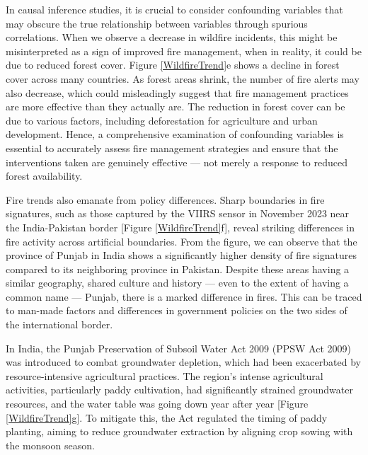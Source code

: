 \documentclass[
  12 pt,
]{Nemilov}
\begin{document}
In causal inference studies, it is crucial to consider confounding variables that may obscure the true relationship between variables through spurious correlations. When we observe a decrease in wildfire incidents, this might be misinterpreted as a sign of improved fire management, when in reality, it could be due to reduced forest cover. Figure \ref{WildfireTrend}e shows a decline in forest cover across many countries. As forest areas shrink, the number of fire alerts may also decrease, which could misleadingly suggest that fire management practices are more effective than they actually are. The reduction in forest cover can be due to various factors, including deforestation for agriculture and urban development. Hence, a comprehensive examination of confounding variables is essential to accurately assess fire management strategies and ensure that the interventions taken are genuinely effective --- not merely a response to reduced forest availability.

Fire trends also emanate from policy differences. Sharp boundaries in fire signatures, such as those captured by the VIIRS sensor in November 2023 near the India-Pakistan border {[}Figure \ref{WildfireTrend}f{]}, reveal striking differences in fire activity across artificial boundaries. From the figure, we can observe that the province of Punjab in India shows a significantly higher density of fire signatures compared to its neighboring province in Pakistan. Despite these areas having a similar geography, shared culture and history --- even to the extent of having a common name --- Punjab, there is a marked difference in fires. This can be traced to man-made factors and differences in government policies on the two sides of the international border.

In India, the Punjab Preservation of Subsoil Water Act 2009 (PPSW Act 2009) was introduced to combat groundwater depletion, which had been exacerbated by resource-intensive agricultural practices. The region's intense agricultural activities, particularly paddy cultivation, had significantly strained groundwater resources, and the water table was going down year after year {[}Figure \ref{WildfireTrend}g{]}. To mitigate this, the Act regulated the timing of paddy planting, aiming to reduce groundwater extraction by aligning crop sowing with the monsoon season.
\end{document}
